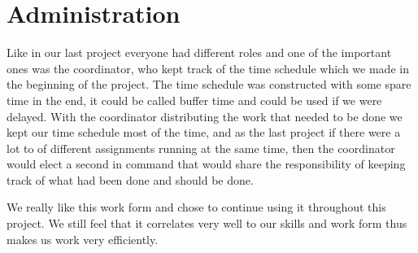 \section{Administration}
Like in our last project everyone had different roles and one of the important ones was the coordinator, who kept track of the time schedule which we made in the beginning of the project. The time schedule was constructed with some spare time in the end, it could be called buffer time and could be used if we were delayed. With the coordinator distributing the work that needed to be done we kept our time schedule most of the time, and as the last project if there were a lot to of different assignments running at the same time, then the coordinator would elect a second in command that would share the responsibility of keeping track of what had been done and should be done.

We really like this work form and chose to continue using it throughout this project. We still feel that it correlates very well to our skills and work form thus makes us work very efficiently.